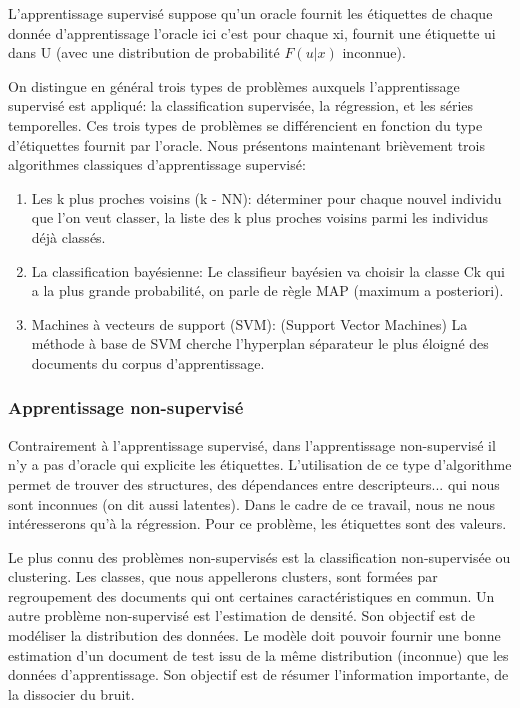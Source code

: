 \documentclass[12pt]{article}
\begin{document}
L'apprentissage supervisé suppose qu'un oracle fournit les étiquettes de chaque donnée d'apprentissage l’oracle ici c’est pour chaque xi, fournit une étiquette ui dans U (avec une distribution de probabilité $F(u|x)$ inconnue).

On distingue en général trois types de problèmes auxquels l'apprentissage supervisé est appliqué: la classification supervisée, la régression, et les séries temporelles. Ces trois types de problèmes se différencient en fonction du type d'étiquettes fournit par l'oracle.
Nous présentons maintenant brièvement trois algorithmes classiques d'apprentissage supervisé:
\begin{enumerate}
	\item Les k plus proches voisins (k - NN): déterminer pour chaque nouvel individu que l'on veut classer, la liste des k plus proches voisins parmi les individus déjà classés.
	\item La classification bayésienne: Le classifieur bayésien va choisir la classe Ck qui a la plus grande probabilité, on parle de règle MAP (maximum a posteriori).
	\item Machines à vecteurs de support (SVM): (Support Vector Machines) La méthode à base de SVM cherche l'hyperplan séparateur le plus éloigné des documents du corpus d'apprentissage.
\end{enumerate}

\subsubsection{Apprentissage non-supervisé}
Contrairement à l'apprentissage supervisé, dans l'apprentissage non-supervisé il n'y a pas d'oracle qui explicite les étiquettes. L'utilisation de ce type d'algorithme permet de trouver des structures, des dépendances entre descripteurs... qui nous sont inconnues (on dit aussi latentes). Dans le cadre de ce travail, nous ne nous intéresserons qu'à la régression. Pour ce problème, les étiquettes sont des valeurs.

Le plus connu des problèmes non-supervisés est la classification non-supervisée ou clustering. Les classes, que nous appellerons clusters, sont formées par regroupement des documents qui ont certaines caractéristiques en commun. Un autre problème non-supervisé est l'estimation de densité. Son objectif est de modéliser la distribution des données. Le modèle doit pouvoir fournir une bonne estimation d'un document de test issu de la même distribution (inconnue) que les données d'apprentissage. Son objectif est de résumer l'information importante, de la dissocier du bruit.
\end{document}
